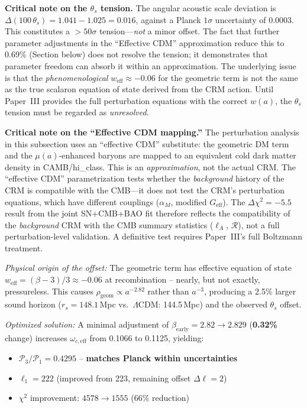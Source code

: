 \documentclass[aps,prd,twocolumn,superscriptaddress,nofootinbib]{revtex4-2}
\begin{document}
\textbf{Critical note on the $\theta_s$ tension.} The angular acoustic scale deviation is $\Delta(100\,\theta_s) = 1.041 - 1.025 = 0.016$, against a Planck $1\sigma$ uncertainty of 0.0003. This constitutes a $>50\sigma$ tension---\emph{not} a minor offset. The fact that further parameter adjustments in the ``Effective CDM'' approximation reduce this to 0.69\% (Section below) does not resolve the tension; it demonstrates that parameter freedom can absorb it within an approximation. The underlying issue is that the \textit{phenomenological} $w_\mathrm{eff} \approx -0.06$ for the geometric term is not the same as the true scalaron equation of state derived from the CRM action. Until Paper~III provides the full perturbation equations with the correct $w(a)$, the $\theta_s$ tension must be regarded as \emph{unresolved}.

\textbf{Critical note on the ``Effective CDM mapping.''} The perturbation analysis in this subsection uses an ``effective CDM'' substitute: the geometric DM term and the $\mu(a)$-enhanced baryons are mapped to an equivalent cold dark matter density in CAMB/hi\_class. This is an \emph{approximation}, not the actual CRM. The ``effective CDM'' parametrization tests whether the \emph{background} history of the CRM is compatible with the CMB---it does not test the CRM's perturbation equations, which have different couplings ($\alpha_M$, modified $G_\mathrm{eff}$). The $\Delta\chi^2 = -5.5$ result from the joint SN+CMB+BAO fit therefore reflects the compatibility of the \emph{background} CRM with the CMB summary statistics ($\ell_A$, $\mathcal{R}$), not a full perturbation-level validation. A definitive test requires Paper~III's full Boltzmann treatment.

\textit{Physical origin of the offset:} The geometric term has effective equation of state $w_{\mathrm{eff}} = (\beta - 3)/3 \approx -0.06$ at recombination -- nearly, but not exactly, pressureless. This causes $\rho_{\mathrm{geom}} \propto a^{-2.82}$ rather than $a^{-3}$, producing a 2.5\% larger sound horizon ($r_s = 148.1$\,Mpc vs.\ $\Lambda$CDM: 144.5\,Mpc) and the observed $\theta_s$ offset.

\textit{Optimized solution:} A minimal adjustment of $\beta_{\mathrm{early}} = 2.82 \to 2.829$ (\textbf{0.32\%} change) increases $\omega_{c,\mathrm{eff}}$ from 0.1066 to 0.1125, yielding:
\begin{itemize}
\item $\mathcal{P}_3/\mathcal{P}_1 = 0.4295$ -- \textbf{matches Planck within uncertainties}
\item $\ell_1 = 222$ (improved from 223, remaining offset $\Delta\ell = 2$)
\item $\chi^2$ improvement: $4578 \to 1555$ (66\% reduction)
\end{itemize}
\end{document}
